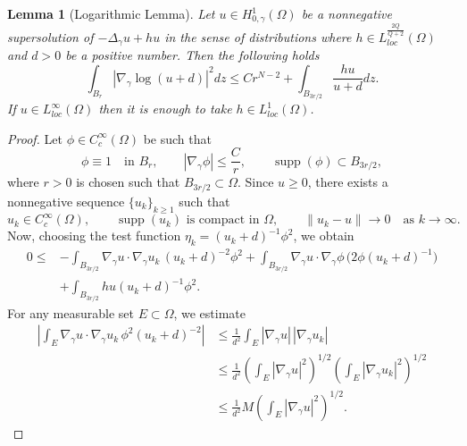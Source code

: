\documentclass[11pt]{article}
\newtheorem{lemma}{Lemma}[section] %
\newcommand{\om} {\Omega}
\newcommand{\Gr}{\Delta_{\gamma}}
\newcommand{\gradgr}{\nabla_{\gamma}}
\newcommand{\spacegr}{H^{1}_{0,\gamma}(\Omega)}
\begin{document}
\begin{lemma}[Logarithmic Lemma]\label{lem:logarithmic_lemma}
Let $u \in \spacegr$ be a nonnegative supersolution of $- \Gr u + h u $ in the sense of distributions where $h \in L_{loc}^{\frac{2Q}{Q+2}}(\om)$ and $d > 0$ be a positive number. Then the following holds
\begin{equation*}
\int_{B_r} |\gradgr \log(u+d)|^2 dz \leq C r^{N-2} + \int_{B_{3r/2}} \frac{h u}{u + d} dz.   
\end{equation*}
If $u \in L_{loc}^{\infty}(\om)$ then it is enough to take $h \in L_{loc}^1(\om)$. 
\end{lemma}
\begin{proof}
Let $\phi \in C_c^\infty(\Omega)$ be such that
\begin{equation*}
\phi \equiv 1 \quad \text{in } B_r, 
\qquad 
|\gradgr \phi| \le \frac{C}{r},
\qquad 
\operatorname{supp}(\phi) \subset B_{3r/2},
\end{equation*}
where $r>0$ is chosen such that $B_{3r/2} \subset \om$. 
Since $u \ge 0$, there exists a nonnegative sequence $\{u_k\}_{k\ge1}$ such that
\begin{equation*}
u_k \in C_c^{\infty}(\om),
\qquad
\operatorname{supp}(u_k) \text{ is compact in } \Omega,
\qquad
\|u_k - u\| \to 0
\quad \text{as } k \to \infty.
\end{equation*}
Now, choosing the test function $\eta_k = (u_k + d)^{-1}\phi^2$, we obtain
\begin{equation}
\label{eq:basic-inequality}
\begin{aligned}
0 \le &
- \int_{B_{3r/2}} 
\gradgr u \cdot \gradgr u_k \,
(u_k + d)^{-2}\phi^2  + \int_{B_{3r/2}} 
\gradgr u \cdot \gradgr \phi \,
\bigl( 2\phi (u_k + d)^{-1} \bigr) \\
& + \int_{B_{3r/2}} h u (u_k +d )^{-1} \phi^2.
\end{aligned}
\end{equation}
For any measurable set $E \subset \Omega$, we estimate
\begin{equation*}
\begin{aligned}
\left|
\int_E 
\gradgr u \cdot \gradgr u_k \,
\phi^2 (u_k + d)^{-2}
\right|
& \le \frac{1}{d^2}
\int_E 
|\gradgr u|\,|\gradgr u_k|
\\
& \le \frac{1}{d^2}
\left( \int_E |\gradgr u|^2 \right)^{1/2}
\left( \int_E |\gradgr u_k|^2 \right)^{1/2}
\\
& \le \frac{1}{d^2} M
\left( \int_E |\gradgr u|^2 \right)^{1/2}.
\end{aligned}

\end{equation*}
\end{proof}
\end{document}
